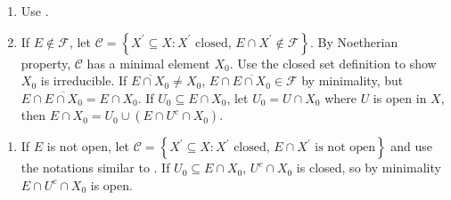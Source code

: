 \begin{exercise}\label{ex7.21}
	\begin{enumerate}
		\item[$\Rightarrow$:] Use .
		\item[$\Leftarrow$:] If $E\notin\mathcal{F}$, let $\mathcal{C}=\left\{X^\prime\subseteq X:X^\prime\text{ closed, }E\cap X^\prime\notin\mathcal{F}\right\}$. By Noetherian property, $\mathcal{C}$ has a minimal element $X_0$. Use the closed set definition to show $X_0$ is irreducible. If $\overline{E\cap X_0}\neq X_0$, $E\cap\overline{E\cap X_0}\in\mathcal{F}$ by minimality, but $E\cap\overline{E\cap X_0}=E\cap X_0$. If $U_0\subseteq E\cap X_0$, let $U_0=U\cap X_0$ where $U$ is open in $X$, then $E\cap X_0=U_0\cup\left(E\cap U^c\cap X_0\right)$.
	\end{enumerate}
\end{exercise}

\begin{exercise}\label{ex7.22}
	\begin{enumerate}
	\item[$\Leftarrow$:] If $E$ is not open, let $\mathcal{C}=\left\{X^\prime\subseteq X:X^\prime\text{ closed, }E\cap X^\prime\text{ is not open}\right\}$ and use the notations similar to . If $U_0\subseteq E\cap X_0$, $U^c\cap X_0$ is closed, so by minimality $E\cap U^c\cap X_0$ is open.
	\end{enumerate}
\end{exercise}

